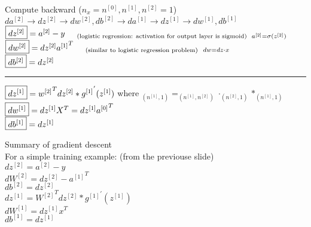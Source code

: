 \documentclass{article}
\begin{document}
Compute backward ($n_x = n^{[0]}, n^{[1]}, n^{[2]}= 1$)\\

$da^{[2]} \rightarrow dz^{[2]} \rightarrow dw^{[2]}, db^{[2]} \rightarrow
da^{[1]} \rightarrow dz^{[1]} \rightarrow dw^{[1]}, db^{[1]}$\\

$\fbox{$dz^{[2]}$} = a^{[2]}-y \hspace{5mm}  _{\text{(logistic regression: activation for output layer is sigmoid)} \hspace{2mm} a^{[2]} = \sigma(z^{[2]})}$ \\

$\fbox{$dw^{[2]}$} = dz^{[2]} {a^{[1]}}^T \hspace{5mm} _{\text{(similar to logistic regression problem)}} \hspace{2mm} _{dw=dz\cdot x}$\\

$\fbox{$db^{[2]}$} = dz^{[2]}$\\

\noindent\rule{8cm}{0.4pt}


$\fbox{$dz^{[1]}$} = {w^{[2]}}^T dz^{[2]} * {g^{[1]}}^{'}(z^{[1]})$ where $_{(n^{[1]},1)} = _{(n^{[1]},n^{[2]})}  \cdot _{(n^{[2]}, 1)} * _{(n^{[1]}, 1)}$\\

$\fbox{$dw^{[1]}$} = dz^{[1]} {X}^T = dz^{[1]} {a^{[0]}}^T$\\

$\fbox{$db^{[1]}$} = dz^{[1]}$\\


\newpage

Summary of gradient descent\\

For a simple training example: (from the previouse slide)\\

$dz^{[2]} = a^{[2]} - y$\\

$dW^{[2]} = dz^{[2]} - {a^{[1]}}^T$\\

$db^{[2]} = dz^{[2]}$\\

$dz^{[1]} = {W^{[2]}}^T dz^{[2]} * {{g^{[1]}}}^{'}(z^{[1]})$\\

$dW^{[1]} = dz^{[1]}x^T$\\

$db^{[1]} = dz^{[1]}$\\
\end{document}
